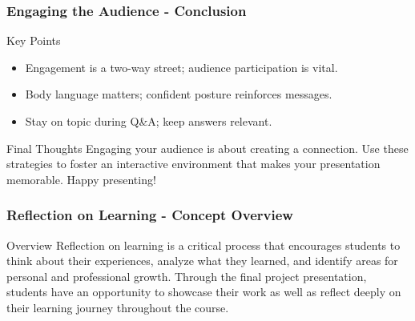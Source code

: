 \documentclass[aspectratio=169]{beamer}
\begin{document}
\begin{frame}[fragile]
    \frametitle{Engaging the Audience - Conclusion}
    \begin{block}{Key Points}
        \begin{itemize}
            \item Engagement is a two-way street; audience participation is vital.
            \item Body language matters; confident posture reinforces messages.
            \item Stay on topic during Q\&A; keep answers relevant.
        \end{itemize}
    \end{block}
    
    \begin{block}{Final Thoughts}
        Engaging your audience is about creating a connection. Use these strategies to foster an interactive environment that makes your presentation memorable. Happy presenting!
    \end{block}
\end{frame}

\begin{frame}[fragile]
    \frametitle{Reflection on Learning - Concept Overview}
    \begin{block}{Overview}
        Reflection on learning is a critical process that encourages students to think about their experiences, analyze what they learned, and identify areas for personal and professional growth.
        Through the final project presentation, students have an opportunity to showcase their work as well as reflect deeply on their learning journey throughout the course.
    \end{block}
\end{frame}
\end{document}
